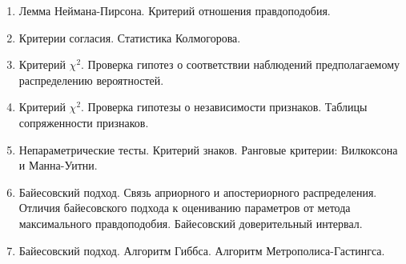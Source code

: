 \begin{enumerate}
\item Лемма Неймана-Пирсона. Критерий отношения правдоподобия.
\item Критерии согласия. Статистика Колмогорова.
\item Критерий $\chi^2$. Проверка гипотез о соответствии наблюдений предполагаемому распределению вероятностей.
\item Критерий $\chi^2$. Проверка гипотезы о независимости признаков. Таблицы сопряженности признаков.
\item Непараметрические тесты. Критерий знаков. Ранговые критерии: Вилкоксона и Манна-Уитни.
\item Байесовский подход. Связь априорного и апостериорного распределения.
Отличия байесовского подхода к оцениванию параметров от метода максимального правдоподобия.
Байесовский доверительный интервал.
\item Байесовский подход. Алгоритм Гиббса. Алгоритм Метрополиса-Гастингса.
\end{enumerate}
